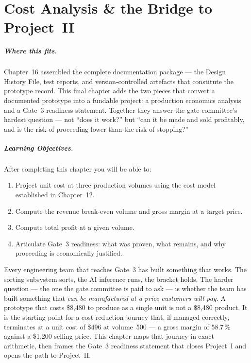 
\chapter{Cost Analysis \& the Bridge to Project~II}
\label{ch17}

\paragraph{Where this fits.}
Chapter~16 assembled the complete documentation package --- the Design History
File, test reports, and version-controlled artefacts that constitute the
prototype record.
This final chapter adds the two pieces that convert a documented prototype
into a fundable project: a production economics analysis and a Gate~3
readiness statement.
Together they answer the gate committee's hardest question --- not ``does it
work?'' but ``can it be made and sold profitably, and is the risk of
proceeding lower than the risk of stopping?''

\paragraph{Learning Objectives.}
After completing this chapter you will be able to:
\begin{enumerate}
  \item Project unit cost at three production volumes using the cost model
        established in Chapter~12.
  \item Compute the revenue break-even volume and gross margin at a target
        price.
  \item Compute total profit at a given volume.
  \item Articulate Gate~3 readiness: what was proven, what remains, and why
        proceeding is economically justified.
\end{enumerate}

Every engineering team that reaches Gate~3 has built something that works.
The sorting subsystem sorts, the AI inference runs, the bracket holds.
The harder question --- the one the gate committee is paid to ask --- is
whether the team has built something that \emph{can be manufactured at a
price customers will pay.}
A prototype that costs \$8,480 to produce as a single unit is not a
\$8,480 product.
It is the starting point for a cost-reduction journey that, if managed
correctly, terminates at a unit cost of \$496 at volume~500 --- a gross
margin of 58.7\,\% against a \$1,200 selling price.
This chapter maps that journey in exact arithmetic, then frames the Gate~3
readiness statement that closes Project~I and opens the path to Project~II.

